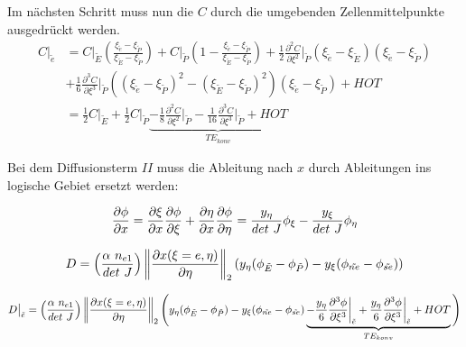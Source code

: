 Im nächsten Schritt muss nun die $C$ durch die umgebenden Zellenmittelpunkte ausgedrückt werden.
\begin{align*}
   C\big\vert_{\tilde{e}}
   &= C\big\vert_{\tilde{E}}
   \left({\frac{\xi_{\tilde{e}}-\xi_{\tilde{P}}}{\xi_{\tilde{E}}-\xi_{\tilde{P}}}}\right)
   + C\big\vert_{\tilde{P}} \left({1-\frac{\xi_{\tilde{e}}-\xi_{\tilde{P}}}{\xi_{\tilde{E}}-\xi_{\tilde{P}}} }\right)
   + \frac{1}{2} \frac{\partial^2 C}{\partial \xi^2}\bigg\vert_{\tilde{P}}
   (\xi_{\tilde{e}}-\xi_{\tilde{E}})(\xi_{\tilde{e}}-\xi_{\tilde{P}})\\
  &+ \frac{1}{6}  \frac{\partial^3 C}{\partial \xi^3}\bigg\vert_{\tilde{P}}
   \left({(\xi_{\tilde{e}}-\xi_{\tilde{P}})^2-(\xi_{\tilde{E}}-\xi_{\tilde{P}})^2}\right)
   (\xi_{\tilde{e}}-\xi_{\tilde{P}}) + HOT\\
   &=\frac{1}{2} C \big\vert_{\tilde{E}} + \frac{1}{2} C \big\vert_{\tilde{P}}
   \underbrace{- \frac{1}{8} \frac{\partial^2 C}{\partial \xi^2}\bigg\vert_{\tilde{P}}
   - \frac{1}{16} \frac{\partial^3 C}{\partial \xi^3}\bigg\vert_{\tilde{P}} + HOT}_{TE_{konv}}
\end{align*}


Bei dem Diffusionsterm $II$ muss die Ableitung nach $x$ durch Ableitungen ins logische
Gebiet ersetzt werden:

\begin{equation}
  \pder[\phi]{x}=\pder[\xi]{x}\pder[\phi]{\xi}+\pder[\eta]{x}\pder[\phi]{\eta}
  = \frac{\yeta}{det\ J} \phi_{\xi} - \frac{\yxi}{det\ J} \phi_{\eta}
\end{equation}

\begin{equation}
  D =\left({\frac{\alpha\ n_{e1}}{det\ J}}\right)
  \left\lVert \frac{\partial x(\xi=e, \eta)}{\partial \eta} \right\rVert_2 
\left({\yeta(\phi_{\tilde{E}}-\phi_{\tilde{P}}) - \yxi(\phi_{\tilde{ne}}-\phi_{\tilde{se}})}\right)
\end{equation}

\begin{equation*}
  D\big\vert_{\etilde} =
  \left({\frac{\alpha\ n_{e1}}{det\ J}}\right)
  \left\lVert \frac{\partial x(\xi=e, \eta)}{\partial \eta} \right\rVert_2 
  \Bigg(\yeta(\phi_{\tilde{E}}-\phi_{\tilde{P}}) - \yxi(\phi_{\tilde{ne}}-\phi_{\tilde{se}})
      \underbrace{ -\frac{\yeta}{6} \frac{\partial^3 \phi}{\partial \xi^3} \bigg\vert_{\etilde}
      +\frac{\yeta}{6} \frac{\partial^3 \phi}{\partial \xi^3} \bigg\vert_{\etilde}
+ HOT}_{TE_{konv}}\Bigg)
\end{equation*}

